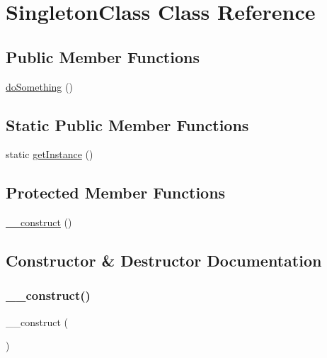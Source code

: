 \hypertarget{class_singleton_class}{}\section{Singleton\+Class Class Reference}
\label{class_singleton_class}
\subsection*{Public Member Functions}
\begin{DoxyCompactItemize}
\item 
\mbox{\hyperlink{class_singleton_class_abe91a8abe16159c0096d570ee6ccc985}{do\+Something}} ()
\end{DoxyCompactItemize}
\subsection*{Static Public Member Functions}
\begin{DoxyCompactItemize}
\item 
static \mbox{\hyperlink{class_singleton_class_ac93fbec81f07e5d15f80db907e63dc10}{get\+Instance}} ()
\end{DoxyCompactItemize}
\subsection*{Protected Member Functions}
\begin{DoxyCompactItemize}
\item 
\mbox{\hyperlink{class_singleton_class_a095c5d389db211932136b53f25f39685}{\+\_\+\+\_\+construct}} ()
\end{DoxyCompactItemize}


\subsection{Constructor \& Destructor Documentation}
\mbox{\label{class_singleton_class_a095c5d389db211932136b53f25f39685}} 
\subsubsection{\texorpdfstring{\+\_\+\+\_\+construct()}{\_\_construct()}}
{\footnotesize\ttfamily \+\_\+\+\_\+construct (\begin{DoxyParamCaption}{ }\end{DoxyParamCaption})\hspace{0.3cm}{\ttfamily [protected]}}



